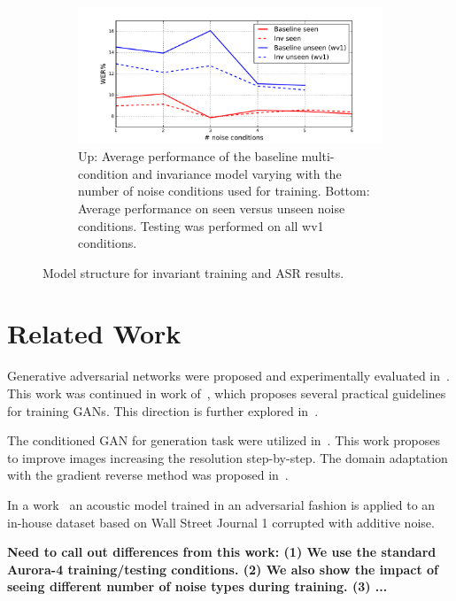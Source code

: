 \documentclass{article}
\begin{document}
\begin{figure}
\begin{subfigure}[b]{0.7\linewidth}
        \includegraphics[width=\linewidth]{wer_seen_unseen.pdf}
        \caption{Up: Average performance of the baseline multi-condition and invariance model varying with  the number of noise
            conditions used for training. Bottom: Average performance on seen versus unseen noise conditions.
            Testing was performed on all wv1 conditions.
            }
        \label{fig:results}
    \end{subfigure}
    \caption{Model structure for invariant training and ASR results.}
\end{figure}

\section{Related Work}
    Generative adversarial networks were proposed and experimentally evaluated 
    in~\cite{goodfellow2014generative}. This work was continued 
    in work of~\cite{radford2015unsupervised}, which proposes several practical guidelines
    for training GANs. This direction is further explored in~\cite{salimans2016improved}.

    The conditioned GAN for generation task were utilized in~\cite{denton2015deep}. This
    work proposes to improve images increasing the resolution step-by-step. 
    The domain adaptation with the gradient reverse method was proposed in~\cite{ganin2014unsupervised}.


    In a work~\cite{yusuke2016adversarial} an acoustic model trained in an adversarial fashion is
    applied to an in-house dataset based on Wall Street Journal 1 corrupted with additive noise.
    
    {\bf Need to call out differences from this work: (1) We use the standard Aurora-4 training/testing conditions. (2) We also show the impact of seeing different number of noise types during training. (3) ...}
\end{document}
